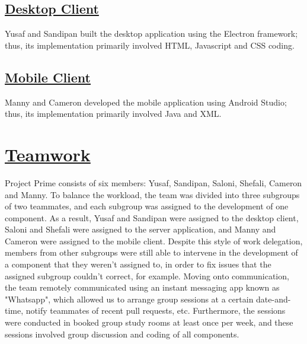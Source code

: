 \documentclass{article}
\begin{document}
\subsection{\underline{Desktop Client}}
Yusaf and Sandipan built the desktop application using the Electron framework; thus, its implementation primarily involved HTML, Javascript and CSS coding.

\subsection{\underline{Mobile Client}}
Manny and Cameron developed the mobile application using Android Studio; thus, its implementation primarily involved Java and XML.

\section{\underline{Teamwork}}
Project Prime consists of six members: Yusaf, Sandipan, Saloni, Shefali, Cameron and Manny. To balance the workload, the team was divided into three subgroups of two teammates, and each subgroup was assigned to the development of one component. As a result, Yusaf and Sandipan were assigned to the desktop client, Saloni and Shefali were assigned to the server application, and Manny and Cameron were assigned to the mobile client. Despite this style of work delegation, members from other subgroups were still able to intervene in the development of a component that they weren't assigned to, in order to fix issues that the assigned subgroup couldn't correct, for example. Moving onto communication, the team remotely communicated using an instant messaging app known as "Whatsapp", which allowed us to arrange group sessions at a certain date-and-time, notify teammates of recent pull requests, etc. Furthermore, the sessions were conducted in booked group study rooms at least once per week, and these sessions involved group discussion and coding of all components. 
\end{document}
